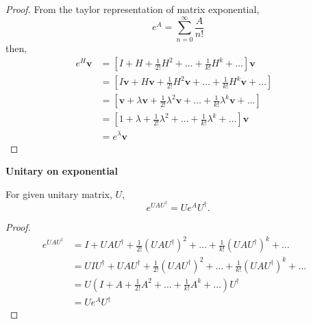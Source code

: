 \begin{proof}
    From the taylor representation of matrix exponential, 
    \begin{equation*}
        e^{A} = \sum_{n=0}^\infty \frac{A}{n!}
    \end{equation*}
    then, 
    \begin{align*}
        e^{H} \mathbf{v} &= \left[ I + H + \frac{1}{2!} H^2 + \dots + \frac{1}{k!}H^k + \dots \right] \mathbf{v}&\\
        &= \left[ I\mathbf{v} + H\mathbf{v} + \frac{1}{2!} H^2\mathbf{v} + \dots + \frac{1}{k!}H^k\mathbf{v} + \dots \right]& \\
        &= \left[ \mathbf{v} + \lambda\mathbf{v} + \frac{1}{2!} \lambda^2\mathbf{v} + \dots + \frac{1}{k!}\lambda^k\mathbf{v} + \dots \right]& \\
        &= \left[ 1 + \lambda+ \frac{1}{2!} \lambda^2+ \dots + \frac{1}{k!}\lambda^k + \dots \right] \mathbf{v}& \\
        &= e^{\lambda} \mathbf{v}&
    \end{align*}
\end{proof}

\begin{theorem}{\textbf{Unitary on exponential}}

    For given unitary matrix, $U$, 
    \begin{equation*}
        e^{U A U ^\dagger} = U e^A U^\dagger \text{.}
    \end{equation*}
\end{theorem}
\begin{proof}
    \begin{align*}
        e^{U A U^\dagger} 
        &=  I + U A U^\dagger + \frac{1}{2!} (U A U^\dagger)^2 + \dots + \frac{1}{k!}(U A U^\dagger)^k + \dots &\\
        &= U I U^\dagger + U A U^\dagger + \frac{1}{2!} (U A U^\dagger)^2 + \dots + \frac{1}{k!}(U A U^\dagger)^k + \dots& \\
        &= U (I + A + \frac{1}{2!}A^2 + \dots + \frac{1}{k!} A^k + \dots ) U^\dagger&\\
        &= U e^A U^\dagger
    \end{align*}
\end{proof}
